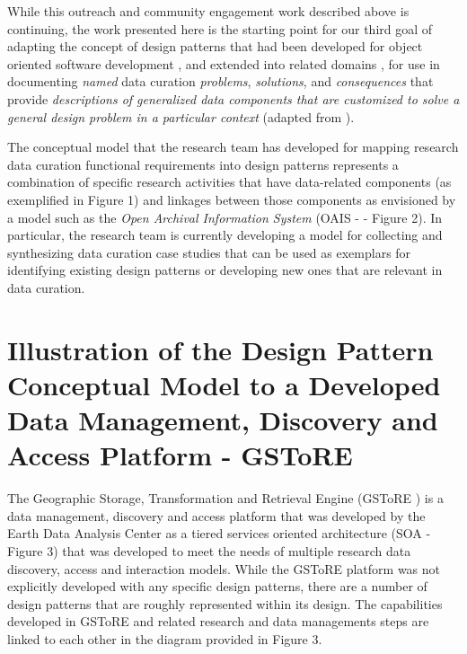 \documentclass[final]{beamer}
\begin{document}
\begin{frame}[t]
\begin{multicols}{3}
While this outreach and community engagement work described above is
continuing, the work presented here is the starting point for our third
goal of adapting the concept of design patterns that had been developed
for object oriented software development \citep{gamma_design_1995}, and
extended into related domains
\citep{daigneau_service_2011, lasater_design_2010, ackerman_patterns-based_2010, schwinn_design_2005, hohpe_enterprise_2003},
for use in documenting \emph{named} data curation \emph{problems},
\emph{solutions}, and \emph{consequences} that provide
\emph{descriptions of generalized data components that are customized to
solve a general design problem in a particular context} (adapted from
\citep[section 1.1]{gamma_design_1995}).

The conceptual model that the research team has developed for mapping
research data curation functional requirements into design patterns
represents a combination of specific research activities that have
data-related components (as exemplified in Figure 1) and linkages
between those components as envisioned by a model such as the \emph{Open
Archival Information System} (OAIS -
\citep{book_reference_2012, _iso_2012, oclc_open_2014} - Figure 2). In
particular, the research team is currently developing a model for
collecting and synthesizing data curation case studies that can be used
as exemplars for identifying existing design patterns or developing new
ones that are relevant in data curation.

\section{Illustration of the Design Pattern Conceptual Model to a
Developed Data Management, Discovery and Access Platform -
GSToRE}\label{illustration-of-the-design-pattern-conceptual-model-to-a-developed-data-management-discovery-and-access-platform---gstore}

The Geographic Storage, Transformation and Retrieval Engine (GSToRE
\citep{_gstore_2016}) is a data management, discovery and access
platform that was developed by the Earth Data Analysis Center as a
tiered services oriented architecture (SOA - Figure 3) that was
developed to meet the needs of multiple research data discovery, access
and interaction models. While the GSToRE platform was not explicitly
developed with any specific design patterns, there are a number of
design patterns that are roughly represented within its design. The
capabilities developed in GSToRE and related research and data
managements steps are linked to each other in the diagram provided in
Figure 3.


\end{multicols}
\end{frame}
\end{document}
